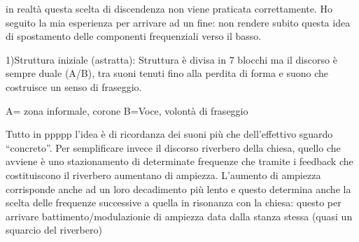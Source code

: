 in realtà questa scelta di discendenza non viene praticata correttamente.
Ho seguito la mia esperienza per arrivare ad un fine: non rendere subito questa
idea di spostamento delle componenti frequenziali verso il basso.

1)Struttura iniziale (astratta):
Struttura è divisa in 7 blocchi ma il discorso è sempre duale (A/B), tra suoni
tenuti fino alla perdita di forma e suono che costruisce un senso di fraseggio.

A= zona informale, corone
B=Voce, volontà di fraseggio

Tutto in ppppp l'idea  è di ricordanza dei suoni più che dell'effettivo sguardo “concreto”.
Per semplificare invece il discorso riverbero della chiesa, quello che avviene è
uno stazionamento di determinate frequenze che tramite i feedback che costituiscono
il riverbero aumentano di ampiezza. L'aumento di ampiezza corrisponde anche ad un loro
decadimento più lento e questo determina anche la scelta delle frequenze successive a
quella in risonanza con la chiesa: questo per arrivare  battimento/modulazionie di
ampiezza data dalla stanza stessa (quasi un squarcio del riverbero)

%
%
%
